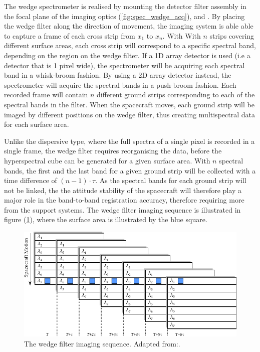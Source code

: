 The wedge spectrometer is realised by mounting the detector filter assembly in the focal plane of the imaging optics (\ref{fig:spec_wedge_acq}), \cite{joseph2015building} and \cite{nieke1997a}. By placing the wedge filter along the direction of movement, the imaging system is able able to capture a frame of each cross strip from $x_1$ to $x_n$. With With $n$ strips covering different surface areas, each cross strip will correspond to a specific spectral band, depending on the region on the wedge filter. If a 1D array detector is used (i.e a detector that is 1 pixel wide), the spectrometer will be acquiring each spectral band in a whisk-broom fashion. By using a 2D array detector instead, the spectrometer will acquire the spectral bands in a push-broom fashion. Each recorded frame will contain $n$ different ground strips corresponding to each of the spectral bands in the filter. When the spacecraft moves, each ground strip will be imaged by different positions on the wedge filter, thus creating multispectral data for each surface area.

Unlike the dispersive type, where the full spectra of a single pixel is recorded in a single frame, the wedge filter requires reorganising the data, before the hyperspectral cube can be generated for a given surface area. With $n$ spectral bands, the first and the last band for a given ground strip will be collected with a time difference of $(n-1)\cdot \tau$. As the spectral bands for each ground strip will not be linked, the the attitude stability of the spacecraft will therefore play a major role in the band-to-band registration accuracy\cite{joseph2015building}, therefore requiring more from the support systems. The wedge filter imaging sequence is illustrated in figure (\ref{fig:wedge_filt_img_sequence}), where the surface area is illustrated by the blue square.
\begin{figure}[H]
\centering
\includegraphics[width=\textwidth]{figures/Orbiter/wedge_filt_img_sequence.pdf}
\caption{The wedge filter imaging sequence. Adapted from:\cite{joseph2015building}.}
\label{fig:wedge_filt_img_sequence}
\end{figure}

